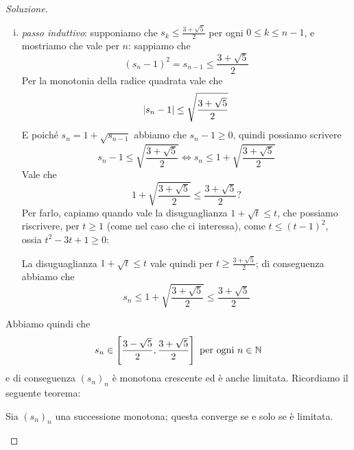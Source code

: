 \begin{proof}[Soluzione]
\begin{enumerate}[(i)]
            \item \emph{passo induttivo}: supponiamo che $s_k\le \frac{3+\sqrt{5}}{2}$ per ogni $0\le k \le n-1$, e mostriamo che vale per $n$: sappiamo che 
            \[
            (s_n-1)^2 = s_{n-1} \le \frac{3+\sqrt{5}}{2}
            \]
            Per la monotonia della radice quadrata vale che
            \[
            \abs{s_n-1}\le \sqrt{\frac{3+\sqrt{5}}{2}}
            \]
            E poiché $s_n = 1+\sqrt{s_{n-1}}$ abbiamo che $s_{n}-1\ge 0$, quindi possiamo scrivere
            \[
            s_n-1\le \sqrt{\frac{3+\sqrt{5}}{2}} \iff s_n\le 1+\sqrt{\frac{3+\sqrt{5}}{2}}
            \]
            Vale che
            \[
            1+\sqrt{\frac{3+\sqrt{5}}{2}}\le \frac{3+\sqrt{5}}{2}?
            \]
            Per farlo, capiamo quando vale la disuguaglianza $1+\sqrt{t}\le t$, che possiamo riscrivere, per $t\ge 1$ (come nel caso che ci interessa), come $t\le (t-1)^2$, ossia $t^2-3t+1\ge 0$:
            \begin{center}
        \end{center}
        La disuguaglianza $1+\sqrt{t}\le t$ vale quindi per $t\ge \frac{3+\sqrt{5}}{2}$; di conseguenza abbiamo che
        \[
        s_n \le 1+\sqrt{\frac{3+\sqrt{5}}{2}}\le \frac{3+\sqrt{5}}{2}
        \]
        \end{enumerate}
        Abbiamo quindi che
        \[
        s_n\in \left[\frac{3-\sqrt{5}}{2}, \frac{3+\sqrt{5}}{2}\right]\ \text{per ogni} \ n\in\amsbb{N}
        \]
        e di conseguenza $(s_n)_n$ è monotona crescente ed è anche limitata. Ricordiamo il seguente teorema:
        \begin{tcolorbox}
            \begin{theorem}
                \label{th:4.7}
                Sia $(s_n)_n$ una successione monotona; questa converge se e solo se è limitata.

\end{theorem}
\end{tcolorbox}
\end{proof}
